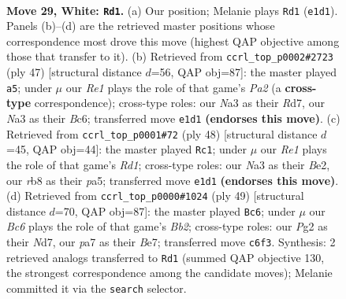 \documentclass[11pt]{article}
\begin{document}
\clearpage

\begin{figure}[p]\centering
\begin{subfigure}{0.46\textwidth}\centering
\resizebox{\linewidth}{!}{%
\newchessgame
\chessboard[
  setfen={1r3r2/p4p1k/bpB1p1pp/2n5/2P5/N1B1P2P/PR3PP1/4RK2 w - - 3 29},
  showmover=false,
  pgfstyle=straightmove, color=movearrow, markmove={e1-d1}
]}
\caption{}
\end{subfigure}\hfill
\begin{subfigure}{0.46\textwidth}\centering
\resizebox{\linewidth}{!}{%
\newchessgame
\chessboard[
  setfen={1r3k2/p2r1pp1/2b2n2/2pp3p/5P1P/P1N1P3/1P1R1PB1/3R2K1 b - - 0 24},
  showmover=false,
  pgfstyle=straightmove, color=movearrow, markmove={a7-a5}
]}
\caption{}
\end{subfigure}
\\[4pt]
\begin{subfigure}{0.46\textwidth}\centering
\resizebox{\linewidth}{!}{%
\newchessgame
\chessboard[
  setfen={rr3nk1/1p4pp/2p3b1/p3p3/4P3/1R1PB3/PP2B1PP/3R2K1 w - - 0 25},
  showmover=false,
  pgfstyle=straightmove, color=movearrow, markmove={d1-c1}
]}
\caption{}
\end{subfigure}\hfill
\begin{subfigure}{0.46\textwidth}\centering
\resizebox{\linewidth}{!}{%
\newchessgame
\chessboard[
  setfen={r7/1b1nbpkp/4p1p1/p2p4/1r1P4/2N1P1P1/1P2BP1P/RR2N1K1 b - - 1 25},
  showmover=false,
  pgfstyle=straightmove, color=movearrow, markmove={b7-c6}
]}
\caption{}
\end{subfigure}
\caption{\textbf{Move 29, White: \texttt{Rd1}.} (a) Our position; Melanie plays \texttt{Rd1} (\texttt{e1d1}). Panels (b)--(d) are the retrieved master positions whose correspondence most drove this move (highest QAP objective among those that transfer to it). (b) Retrieved from \texttt{ccrl\_top\_p0002\#2723} (ply 47) [structural distance $d$=56, QAP obj=87]: the master played \texttt{a5}; under $\mu$ our \emph{Re1} plays the role of that game's \emph{Pa2} (a \textbf{cross-type} correspondence); cross-type roles: our \emph{N}a3 as their \emph{R}d7, our \emph{N}a3 as their \emph{B}c6; transferred move \texttt{e1d1} \textbf{(endorses this move)}. (c) Retrieved from \texttt{ccrl\_top\_p0001\#72} (ply 48) [structural distance $d$=45, QAP obj=44]: the master played \texttt{Rc1}; under $\mu$ our \emph{Re1} plays the role of that game's \emph{Rd1}; cross-type roles: our \emph{N}a3 as their \emph{B}e2, our \emph{r}b8 as their \emph{p}a5; transferred move \texttt{e1d1} \textbf{(endorses this move)}. (d) Retrieved from \texttt{ccrl\_top\_p0000\#1024} (ply 49) [structural distance $d$=70, QAP obj=87]: the master played \texttt{Bc6}; under $\mu$ our \emph{Bc6} plays the role of that game's \emph{Bb2}; cross-type roles: our \emph{P}g2 as their \emph{N}d7, our \emph{p}a7 as their \emph{B}e7; transferred move \texttt{c6f3}. Synthesis: 2 retrieved analogs transferred to \texttt{Rd1} (summed QAP objective 130, the strongest correspondence among the candidate moves); Melanie committed it via the \texttt{search} selector.}
\label{fig:thought-m56}
\end{figure}
\end{document}

